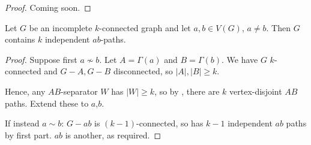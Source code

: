 \documentclass{article}
\begin{document}
\begin{proof}
    Coming soon.
\end{proof}
\begin{ncor}\label{cor:35}
    Let $G$ be an incomplete $k$-connected graph and let $a,b \in V(G)$, $a \neq b$.
    Then $G$ contains $k$ independent $ab$-paths.
\end{ncor}
\begin{proof}
    Suppose first $a \nsim b$. Let $A = \Gamma(a)$ and $B = \Gamma(b)$.
    We have $G$ $k$-connected and $G-A,G-B$ disconnected, so $|A|,|B|\geq k$.

    Hence, any $AB$-separator $W$ has $|W| \geq k$, so by , there are $k$ vertex-disjoint $AB$ paths.
    Extend these to $a$,$b$.

    If instead $a \sim b$: $G-ab$ is $(k-1)$-connected, so has $k-1$ independent $ab$ paths by first part.
    $ab$ is another, as required.
\end{proof}
\end{document}
